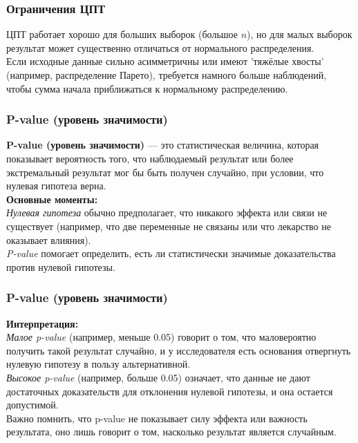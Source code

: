 \documentclass[aspectratio=169]{beamer}
\begin{document}
\begin{frame}
\frametitle{Ограничения ЦПТ}
ЦПТ работает хорошо для больших выборок (большое \(n\)), но для малых выборок результат может существенно отличаться от нормального распределения.
\newline\\
Если исходные данные сильно асимметричны или имеют 'тяжёлые хвосты' (например, распределение Парето), требуется намного больше наблюдений, чтобы сумма начала приближаться к нормальному распределению.
\end{frame}

\begin{frame}
\frametitle{P-value (уровень значимости)}
{\bf P-value (уровень значимости)} — это статистическая величина, которая показывает вероятность того, что наблюдаемый результат или более экстремальный результат мог бы быть получен случайно, при условии, что нулевая гипотеза верна. 
\newline\\
{\bf Основные моменты:}\\
{\it Нулевая гипотеза} обычно предполагает, что никакого эффекта или связи не существует (например, что две переменные не связаны или что лекарство не оказывает влияния).\\
{\it P-value} помогает определить, есть ли статистически значимые доказательства против нулевой гипотезы.
\end{frame}

\begin{frame}
\frametitle{P-value (уровень значимости)}
{\bf Интерпретация:}\\
{\it Малое p-value} (например, меньше 0.05) говорит о том, что маловероятно получить такой результат случайно, и у исследователя есть основания отвергнуть нулевую гипотезу в пользу альтернативной.\\
{\it Высокое p-value} (например, больше 0.05) означает, что данные не дают достаточных доказательств для отклонения нулевой гипотезы, и она остается допустимой.
\newline\\
Важно помнить, что p-value не показывает силу эффекта или важность результата, оно лишь говорит о том, насколько результат является случайным.
\end{frame}
\end{document}
